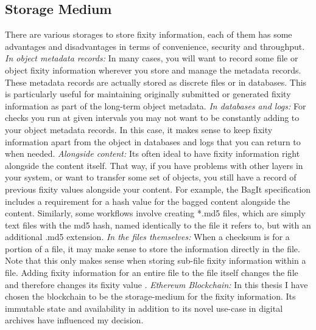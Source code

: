 \documentclass[final]{vutinfth}
\begin{document}
\subsection{Storage Medium}
\label{sec:storage-medium}
There are various storages to store fixity information, each of them has some advantages and disadvantages in terms of convenience, security and throughput.
\newline \textit{In object metadata records:} In many cases, you will want to record some file or object fixity information wherever you store and manage the metadata records. These metadata records are actually stored as discrete files or in databases. This is particularly useful for maintaining originally submitted or generated fixity information as part of the long-term object metadata. 
\newline \textit{In databases and logs:} For checks you run at given intervals you may not want to be constantly adding to your object metadata records. In this case, it makes sense to keep fixity information apart from the object in databases and logs that you can return to when needed.
\newline \textit{Alongside content:} Its often ideal to have fixity information right alongside the content itself. That way, if you have problems with other layers in your system, or want to transfer some set of objects, you still have a record of previous fixity values alongside your content. For example, the BagIt specification includes a requirement for a hash value for the bagged content alongside the content. Similarly, some workflows involve creating *.md5 files, which are simply text files with the md5 hash, named identically to the file it refers to, but with an additional .md5 extension.
\newline \textit{In the files themselves:} When a checksum is for a portion of a file, it may make sense to store the information directly in the file. Note that this only makes sense when storing sub-file fixity information within a file. Adding fixity information for an entire file to the file itself changes the file and therefore changes its fixity value \cite[7]{ndsa2014fixity}.
\newline \textit{Ethereum Blockchain:} In this thesis I have chosen the blockchain to be the storage-medium for the fixity information. Its immutable state and availability in addition to its novel use-case in digital archives have influenced my decision.
\end{document}

